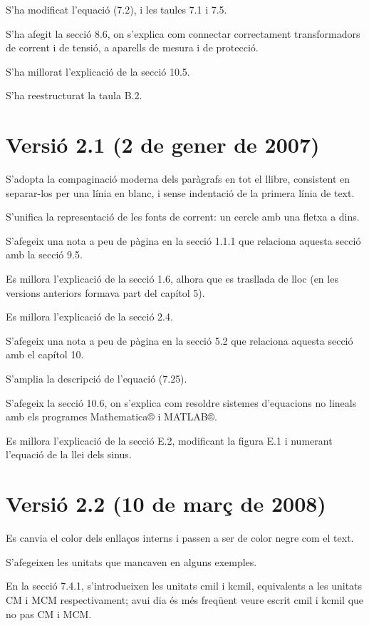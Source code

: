  S'ha modificat l'equació (7.2),
i les taules 7.1 i 7.5.

S'ha afegit la secció 8.6, on s'explica com
connectar correctament transformadors de corrent i de tensió, a
aparells de mesura i de protecció.

S'ha millorat l'explicació de la secció 10.5.

S'ha reestructurat la taula B.2.

\section*{Versió 2.1 (2 de gener de 2007)}

S'adopta la compaginació moderna dels paràgrafs en tot el llibre, consistent en separar-los per una línia en blanc, i sense indentació de la primera línia de text.

S'unifica la representació de les fonts de corrent: un cercle amb una fletxa a dins.

S'afegeix una nota a peu de pàgina en la secció 1.1.1 que relaciona aquesta secció amb la secció 9.5.

Es millora l'explicació de la secció 1.6, alhora que es trasllada de lloc (en les versions anteriors formava part del capítol 5).

Es millora l'explicació de la secció 2.4.

S'afegeix una nota a peu de pàgina en la secció 5.2 que relaciona aquesta secció amb el capítol 10.

S'amplia la descripció de l'equació (7.25).

S'afegeix la secció 10.6, on s'explica com resoldre sistemes d'equacions no lineals amb els programes Mathematica®  i MATLAB®.

Es millora l'explicació de la secció E.2, modificant la figura E.1 i numerant l'equació de la llei dels sinus.

\section*{Versió 2.2 (10 de març de 2008)}

Es canvia el color dels enllaços interns i passen a ser de color negre com el text.

S'afegeixen les unitats que mancaven en alguns exemples.

En la secció 7.4.1, s'introdueixen les unitats cmil i kcmil, equivalents a les unitats CM i MCM respectivament; avui dia és més freqüent veure escrit cmil i kcmil que no pas CM i MCM.

